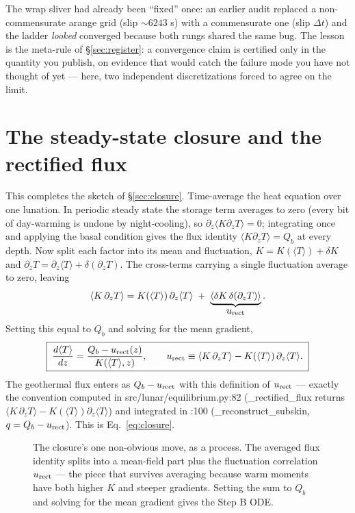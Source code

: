 \documentclass[11pt]{report}
\newcommand{\Tm}{\langle T\rangle}
\newcommand{\code}[1]{{\ttfamily\small #1}}
\begin{document}
\begin{warn}
The wrap sliver had already been ``fixed'' once: an earlier audit replaced a
non-commensurate \code{arange} grid (slip ${\sim}6243$ s) with a
commensurate one (slip $\Delta t$) and the ladder \emph{looked} converged
because both rungs shared the same bug. The lesson is the meta-rule of
\S\ref{sec:register}: a convergence claim is certified only in the quantity
you publish, on evidence that would catch the failure mode you have not
thought of yet --- here, two independent discretizations forced to agree on
the limit.
\end{warn}

\section{The steady-state closure and the rectified flux}\label{app:closure}
This completes the sketch of \S\ref{sec:closure}. Time-average the heat equation
over one lunation. In periodic steady state the storage term averages to zero
(every bit of day-warming is undone by night-cooling), so
$\partial_z\langle K\partial_z T\rangle=0$; integrating once and applying the
basal condition gives the flux identity $\langle K\partial_z T\rangle=Q_b$ at
every depth. Now split each factor into its mean and fluctuation,
$K=K(\Tm)+\delta K$ and $\partial_z T=\partial_z\Tm+\delta(\partial_z T)$. The
cross-terms carrying a single fluctuation average to zero, leaving
\[
\langle K\,\partial_z T\rangle
= K(\Tm)\,\partial_z\Tm \;+\; \underbrace{\langle \delta K\,\delta(\partial_z
T)\rangle}_{\textstyle u_{\rm rect}}.
\]
Setting this equal to $Q_b$ and solving for the mean gradient,
\[
\boxed{\;\frac{d\Tm}{dz}=\frac{Q_b-u_{\rm rect}(z)}{K(\Tm,z)},\qquad
u_{\rm rect}\equiv\langle K\,\partial_z T\rangle-K(\Tm)\,\partial_z\Tm.\;}
\]
The geothermal flux enters as $Q_b-u_{\rm rect}$ with this definition of
$u_{\rm rect}$ --- exactly the convention computed in
\code{src/lunar/equilibrium.py:82} (\code{\_rectified\_flux} returns
$\langle K\,\partial_z T\rangle-K(\Tm)\partial_z\Tm$) and integrated in
\code{:100} (\code{\_reconstruct\_subskin}, $q=Q_b-u_{\rm rect}$). This is
Eq.~\eqref{eq:closure}.

\begin{figure}[htbp]\centering

\caption{The closure's one non-obvious move, as a process. The averaged flux
identity splits into a mean-field part plus the fluctuation correlation
$u_{\rm rect}$ --- the piece that survives averaging because warm moments have
both higher $K$ and steeper gradients. Setting the sum to $Q_b$ and solving
for the mean gradient gives the Step B ODE.}
\label{fig:urectsplit}
\end{figure}
\end{document}
